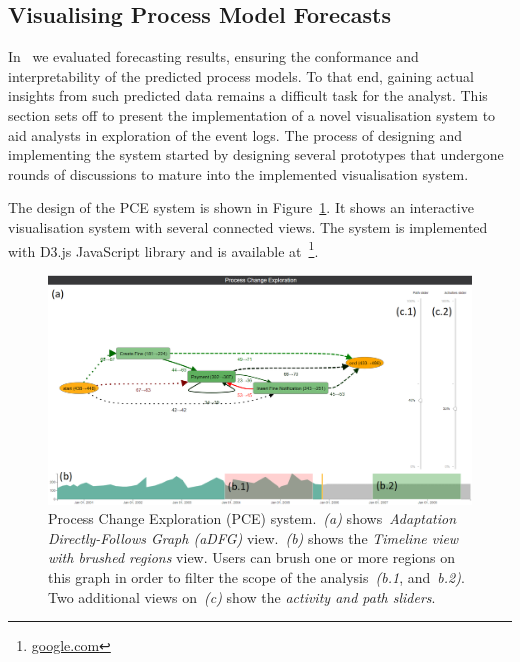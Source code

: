 \subsection{Visualising Process Model Forecasts}\label{sec:visualisation}

In~ we evaluated forecasting results, ensuring the conformance and interpretability of the predicted process models. To that end, gaining actual insights from such predicted data remains a difficult task for the analyst. This section sets off to present the implementation of a novel visualisation system to aid analysts in exploration of the event logs. The process of designing and implementing the system started by designing several prototypes that undergone rounds of discussions to mature into the implemented visualisation system. 

The design of the PCE system is shown in Figure~\ref{fig:vis-two-brushes}. It shows an interactive visualisation system with several connected views. The system is implemented with D3.js JavaScript library and is available at~\footnote{\url{google.com}}.

\begin{figure}
	\centering
	\includegraphics[width=\textwidth]{img/vis/actual-predicted-two-brushed-regions-system.PNG}
	\caption{Process Change Exploration (PCE) system.~\emph{(a)} shows~\emph{Adaptation Directly-Follows Graph (aDFG)} view.~\emph{(b)} shows the \emph{Timeline view with brushed regions} view. Users can brush one or more regions on this graph in order to filter the scope of the analysis~\emph{(b.1}, and~\emph{b.2)}. Two additional views on~\emph{(c)} show the \emph{activity and path sliders}.} 
	\label{fig:vis-two-brushes}
\end{figure}